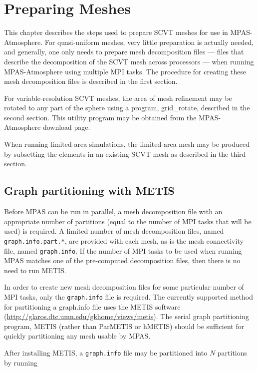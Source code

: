 \chapter{Preparing Meshes}
\label{chap:mpas_grid_preparation}

This chapter describes the steps used to prepare SCVT meshes for use in MPAS-Atmosphere.
For quasi-uniform meshes, very little preparation is actually needed, and
generally, one only needs to prepare mesh decomposition files --- files that
describe the decomposition of the SCVT mesh across processors --- when running
MPAS-Atmosphere using multiple MPI tasks. The procedure for creating these mesh
decomposition files is described in the first section. 

For variable-resolution SCVT meshes, the area of mesh refinement may be rotated
to any part of the sphere using a program, grid\_rotate, described in the second
section. This utility program may be obtained from the MPAS-Atmosphere download page.

When running limited-area simulations, the limited-area mesh may be produced by
subsetting the elements in an existing SCVT mesh as described in the third section.

\section{Graph partitioning with METIS} 
\label{sec:metis}

Before MPAS can be run in parallel, a mesh decomposition file with an
appropriate number of partitions (equal to the number of MPI tasks that will be
used) is required. A limited number of mesh decomposition files, named {\tt
graph.info.part.*}, are provided with each mesh, as is the mesh
connectivity file, named {\tt graph.info}. If the number of MPI tasks to be used when
running MPAS matches one of the pre-computed decomposition files, then there
is no need to run METIS.

In order to create new mesh decomposition files for some particular number of MPI tasks, 
only the {\tt graph.info} file is required.  The currently supported method for partitioning
a graph.info file uses the METIS software
(\url{http://glaros.dtc.umn.edu/gkhome/views/metis}).  The serial graph partitioning
program, METIS (rather than ParMETIS or hMETIS) should be sufficient for
quickly partitioning any mesh usable by MPAS.

After installing METIS, a {\tt graph.info} file may be partitioned into $N$
partitions by running

